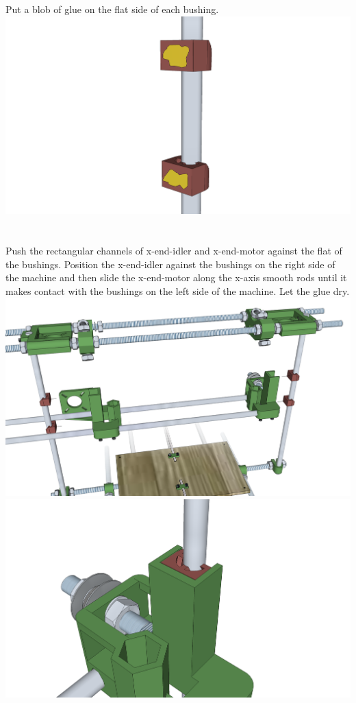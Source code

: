 \documentclass[twoside,a4paper,titlepage]{memoir}
\begin{document}
	\section{}
	Put a blob of glue on the flat side of each bushing.\\
	\includegraphics[width=1\linewidth]{graphics/ch8_11.png}
	
	\section{}
	Push the rectangular channels of x-end-idler and x-end-motor against the flat of the bushings. Position
	the x-end-idler against the bushings on the right side of the machine and then slide the x-end-motor
	along the x-axis smooth rods until it makes contact with the bushings on the left side of the machine.
	Let the glue dry.\\
	\includegraphics[width=1\linewidth]{graphics/ch8_12_1.png}
	\includegraphics[width=1\linewidth]{graphics/ch8_12_2.png}
	
\end{document}
